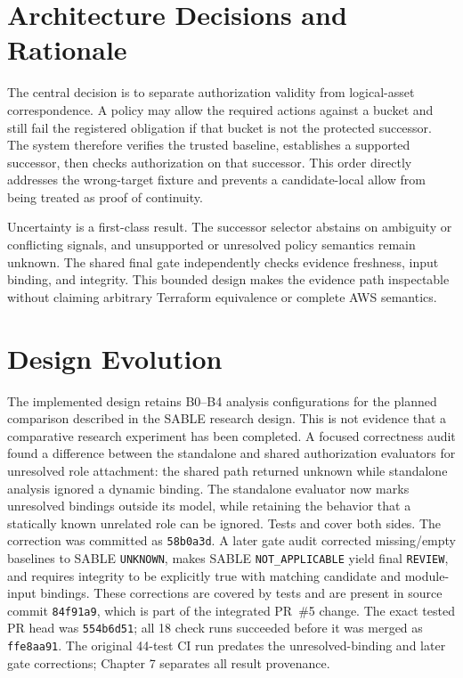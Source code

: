 \section{Architecture Decisions and Rationale}
The central decision is to separate authorization validity from logical-asset correspondence. A policy may allow the required actions against a bucket and still fail the registered obligation if that bucket is not the protected successor. The system therefore verifies the trusted baseline, establishes a supported successor, then checks authorization on that successor. This order directly addresses the wrong-target fixture and prevents a candidate-local allow from being treated as proof of continuity.

Uncertainty is a first-class result. The successor selector abstains on ambiguity or conflicting signals, and unsupported or unresolved policy semantics remain unknown. The shared final gate independently checks evidence freshness, input binding, and integrity. This bounded design makes the evidence path inspectable without claiming arbitrary Terraform equivalence or complete AWS semantics.

\section{Design Evolution}
The implemented design retains B0--B4 analysis configurations for the planned comparison described in the SABLE research design. This is not evidence that a comparative research experiment has been completed. A focused correctness audit found a difference between the standalone and shared authorization evaluators for unresolved role attachment: the shared path returned unknown while standalone analysis ignored a dynamic binding. The standalone evaluator now marks unresolved bindings outside its model, while retaining the behavior that a statically known unrelated role can be ignored. Tests  and  cover both sides. The correction was committed as \texttt{58b0a3d}. A later gate audit corrected missing/empty baselines to SABLE \texttt{UNKNOWN}, makes SABLE \texttt{NOT\_APPLICABLE} yield final \texttt{REVIEW}, and requires integrity to be explicitly true with matching candidate and module-input bindings. These corrections are covered by tests and are present in source commit \texttt{84f91a9}, which is part of the integrated PR~\#5 change. The exact tested PR head was \texttt{554b6d51}; all 18 check runs succeeded before it was merged as \texttt{ffe8aa91}. The original 44-test CI run predates the unresolved-binding and later gate corrections; Chapter 7 separates all result provenance.

